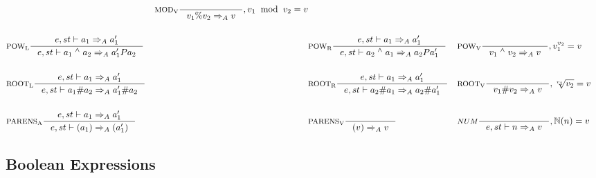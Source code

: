 \begin{align*}
&
&\inference[$\text{MOD}_\text{V}$]{}
                    {v_1 \% v_2 \Rightarrow_A v}
										{, v_1 \;\; \textrm{mod} \;\; v_2 = v}
\\\\
&\inference[$\text{POW}_\text{L}$]{e,st \vdash a_1  \Rightarrow_A a_1'}
                    {e,st \vdash a_1 \; ^\wedge{} \; a_2 \Rightarrow_A a_1' P a_2}
&
&\inference[$\text{POW}_\text{R}$]{e,st \vdash a_1 \Rightarrow_A a_1'}
                    {e,st \vdash a_2 \; ^\wedge{} \; a_1 \Rightarrow_A a_2 P a_1'}
&
&\inference[$\text{POW}_\text{V}$]{}
                    {v_1 \; ^\wedge{} \; v_2 \Rightarrow_A v}
										{, v_1 ^ {v_2} = v}
\\\\
&\inference[$\text{ROOT}_\text{L}$]{e,st \vdash a_1 \Rightarrow_A a_1'}
                    {e,st \vdash a_1 \# a_2 \Rightarrow_A a_1' \# a_2}
&
&\inference[$\text{ROOT}_\text{R}$]{e,st \vdash a_1 \Rightarrow_A a_1'}
                    {e,st \vdash a_2 \# a_1 \Rightarrow_A a_2 \# a_1'}
&
&\inference[$\text{ROOT}_\text{V}$]{}
                    {v_1 \# v_2 \Rightarrow_A v}
										{, \sqrt[v_1]{v_2} = v}
\\\\
&\inference[$\text{PARENS}_\text{A}$]{e,st \vdash a_1 \Rightarrow_A a_1'}
                       {e,st \vdash (a_1) \Rightarrow_A (a_1')}
&
&\inference[$\text{PARENS}_\text{V}$]{}
                       {(v) \Rightarrow_A v}
&
&\inference[$NUM$]{}
                  {e,st \vdash n \Rightarrow_A v}
									{, \mathbb{N}(n) = v}
\end{align*}

\subsection{Boolean Expressions}
\newcommand{\Tand}{\mathbin{\text{AND}}}
\newcommand{\Tnot}{\mathbin{\text{NOT}}}
\newcommand{\Tnand}{\mathbin{\text{NAND}}}
\newcommand{\Tor}{\mathbin{\text{OR}}}
\newcommand{\Tnor}{\mathbin{\text{NOR}}}
\newcommand{\Txor}{\mathbin{\text{XOR}}}

